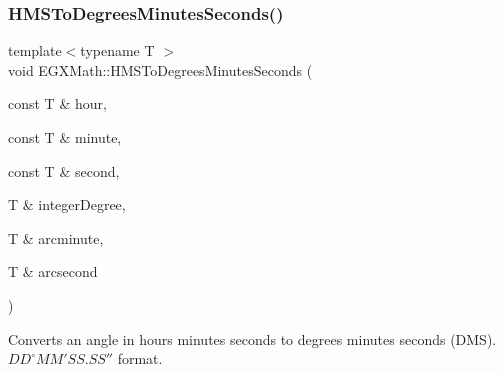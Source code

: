 \mbox{\label{group___e_g_x_math-_angle_conversions-_h_m_s_ga7f694aec9b3e7cc9d94d510e27e4403f}} 
\subsubsection{\texorpdfstring{H\+M\+S\+To\+Degrees\+Minutes\+Seconds()}{HMSToDegreesMinutesSeconds()}}
{\footnotesize\ttfamily template$<$typename T $>$ \\
void E\+G\+X\+Math\+::\+H\+M\+S\+To\+Degrees\+Minutes\+Seconds (\begin{DoxyParamCaption}\item[{const T \&}]{hour,  }\item[{const T \&}]{minute,  }\item[{const T \&}]{second,  }\item[{T \&}]{integer\+Degree,  }\item[{T \&}]{arcminute,  }\item[{T \&}]{arcsecond }\end{DoxyParamCaption})}



Converts an angle in hours minutes seconds to degrees minutes seconds (D\+MS). ${DD}^{\circ}{MM}'{SS.SS}''$ format. 

